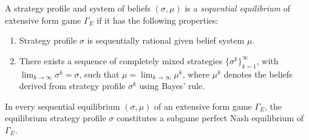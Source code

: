 \begin{defn}
    A strategy profile and system of beliefs $(\sigma, \mu)$ is a \emph{sequential equilibrium} of extensive form game $\Gamma_E$ if it has the following properties:
    \begin{enumerate}
        \item Strategy profile $\sigma$ is sequentially rational given belief system $\mu$.
        \item There exists a sequence of completely mixed strategies $\{\sigma^k\}_{k = 1}^\infty$, with $\lim_{k \to \infty} \sigma^k = \sigma$, such that $\mu = \lim_{k \to \infty} \mu^k$, where $\mu^k$ denotes the beliefs derived from strategy profile $\sigma^k$ using Bayes' rule.
    \end{enumerate}
\end{defn}

\begin{prop}
    In every sequential equilibrium $(\sigma, \mu)$ of an extensive form game $\Gamma_E$, the equilibrium strategy profile $\sigma$ constitutes a subgame perfect Nash equilibrium of $\Gamma_E$.
\end{prop}
